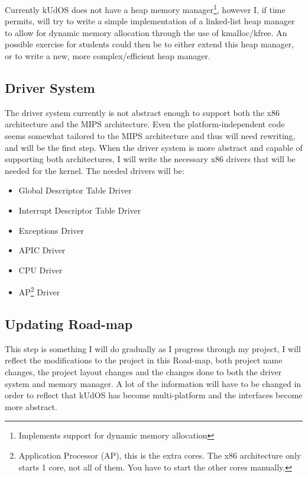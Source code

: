 Currently kUdOS does not have a heap memory manager\footnote{Implements support for dynamic memory allocation}, however I, if time permits, will try to write a simple implementation of a linked-list heap manager to allow for dynamic memory allocation through the use of kmalloc/kfree. An possible exercise for students could then be to either extend this heap manager, or to write a new, more complex/efficient heap manager.

\subsection{Driver System}

The driver system currently is not abstract enough to support both the x86 architecture and the MIPS architecture. Even the platform-independent code seems somewhat tailored to the MIPS architecture and thus will need rewriting, and will be the first step. When the driver system is more abstract and capable of supporting both architectures, I will write the necessary x86 drivers that will be needed for the kernel. The needed drivers will be:
\begin{itemize}
 \item Global Descriptor Table Driver
 \item Interrupt Descriptor Table Driver
 \item Exceptions Driver
 \item APIC Driver
 \item CPU Driver
 \item AP\footnote{Application Processor (AP), this is the extra cores. The x86 architecture only starts 1 core, not all of them. You have to start the other cores manually.} Driver
\end{itemize}

\subsection{Updating Road-map}

This step is something I will do gradually as I progress through my project, I will reflect the modifications to the project in this Road-map, both project name changes, the project layout changes and the changes done to both the driver system and memory manager. A lot of the information will have to be changed in order to reflect that kUdOS has become multi-platform and the interfaces become more abstract. 


